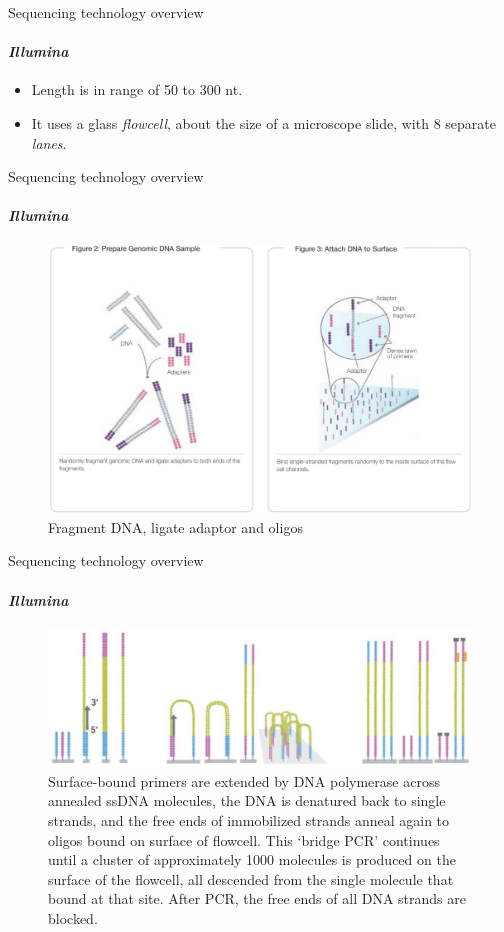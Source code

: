 \documentclass{if-beamer}
\begin{document}
\begin{frame}{Sequencing technology overview}
\framesubtitle{\emph{Illumina}}
\begin{large}
\begin{itemize}
    \item Length is in range of 50 to 300 nt.
    \item It uses a glass \textit{flowcell}, about the size of a microscope slide, with 8 separate \textit{lanes}.
\end{itemize}
\end{large}
\end{frame}
\begin{frame}{Sequencing technology overview}
\framesubtitle{\emph{Illumina}}
\begin{figure}
\centering
\includegraphics[scale=0.2]{illumina1.jpg}
\caption{Fragment DNA, ligate adaptor and oligos} 
\end{figure}
\end{frame}
\begin{frame}{Sequencing technology overview}
\framesubtitle{\emph{Illumina}}
\begin{figure}
\centering
\includegraphics[scale=0.25]{illumina_extra.jpg}
\caption{Surface-bound primers are extended by DNA polymerase across annealed ssDNA molecules, the DNA is denatured back to single strands, and the free ends of immobilized strands anneal again to oligos bound on surface of flowcell. This ‘bridge PCR’ continues until a cluster of approximately 1000 molecules is produced on the surface of the flowcell, all descended from the single molecule that bound at that site. After PCR, the free ends of all DNA strands are blocked.} 
\end{figure}
\end{frame}
\end{document}
